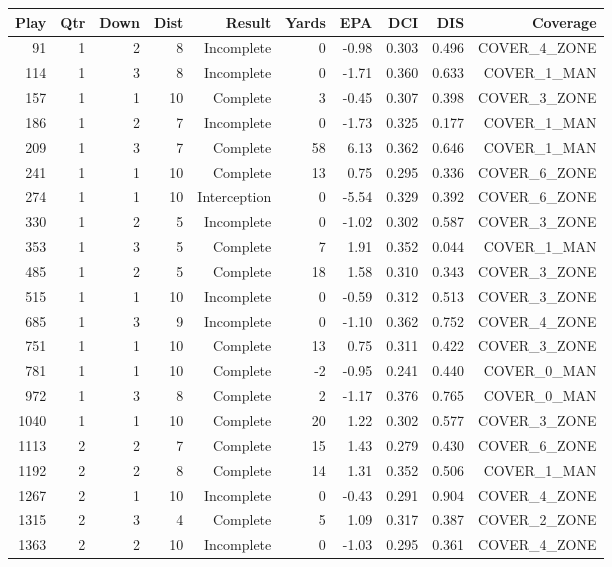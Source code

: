 \begin{tabular}{rrrrrrrrrr}
\toprule
Play & Qtr & Down & Dist & Result & Yards & EPA & DCI & DIS & Coverage \\
\midrule
91 & 1 & 2 & 8 & Incomplete & 0 & -0.98 & 0.303 & 0.496 & COVER\_4\_ZONE \\
114 & 1 & 3 & 8 & Incomplete & 0 & -1.71 & 0.360 & 0.633 & COVER\_1\_MAN \\
157 & 1 & 1 & 10 & Complete & 3 & -0.45 & 0.307 & 0.398 & COVER\_3\_ZONE \\
186 & 1 & 2 & 7 & Incomplete & 0 & -1.73 & 0.325 & 0.177 & COVER\_1\_MAN \\
209 & 1 & 3 & 7 & Complete & 58 & 6.13 & 0.362 & 0.646 & COVER\_1\_MAN \\
241 & 1 & 1 & 10 & Complete & 13 & 0.75 & 0.295 & 0.336 & COVER\_6\_ZONE \\
274 & 1 & 1 & 10 & Interception & 0 & -5.54 & 0.329 & 0.392 & COVER\_6\_ZONE \\
330 & 1 & 2 & 5 & Incomplete & 0 & -1.02 & 0.302 & 0.587 & COVER\_3\_ZONE \\
353 & 1 & 3 & 5 & Complete & 7 & 1.91 & 0.352 & 0.044 & COVER\_1\_MAN \\
485 & 1 & 2 & 5 & Complete & 18 & 1.58 & 0.310 & 0.343 & COVER\_3\_ZONE \\
515 & 1 & 1 & 10 & Incomplete & 0 & -0.59 & 0.312 & 0.513 & COVER\_3\_ZONE \\
685 & 1 & 3 & 9 & Incomplete & 0 & -1.10 & 0.362 & 0.752 & COVER\_4\_ZONE \\
751 & 1 & 1 & 10 & Complete & 13 & 0.75 & 0.311 & 0.422 & COVER\_3\_ZONE \\
781 & 1 & 1 & 10 & Complete & -2 & -0.95 & 0.241 & 0.440 & COVER\_0\_MAN \\
972 & 1 & 3 & 8 & Complete & 2 & -1.17 & 0.376 & 0.765 & COVER\_0\_MAN \\
1040 & 1 & 1 & 10 & Complete & 20 & 1.22 & 0.302 & 0.577 & COVER\_3\_ZONE \\
1113 & 2 & 2 & 7 & Complete & 15 & 1.43 & 0.279 & 0.430 & COVER\_6\_ZONE \\
1192 & 2 & 2 & 8 & Complete & 14 & 1.31 & 0.352 & 0.506 & COVER\_1\_MAN \\
1267 & 2 & 1 & 10 & Incomplete & 0 & -0.43 & 0.291 & 0.904 & COVER\_4\_ZONE \\
1315 & 2 & 3 & 4 & Complete & 5 & 1.09 & 0.317 & 0.387 & COVER\_2\_ZONE \\
1363 & 2 & 2 & 10 & Incomplete & 0 & -1.03 & 0.295 & 0.361 & COVER\_4\_ZONE \\

\end{tabular}
